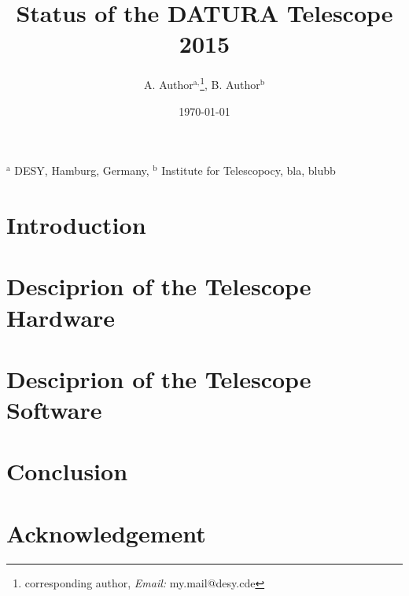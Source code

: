\documentclass{JINST}
\title{Status of the DATURA Telescope 2015}
\author{A. Author${}^{\textrm{a},}$\thanks{corresponding author, \textit{Email:} my.mail@desy.cde}, B. Author${}^{\textrm{b}}$}
\begin{document}
 \setpagewiselinenumbers
\modulolinenumbers[5]
\linenumbers


\date{\today}
\maketitle


\hspace{0.85cm}${}^{\textrm{a}}$ DESY, Hamburg, Germany, ${}^{\textrm{b}}$ Institute for Telescopocy, bla, blubb


\normalsize

\section{Introduction}


\section{Desciprion of the Telescope Hardware}
%

\section{Desciprion of the Telescope Software}
%

\section{Conclusion}

\section*{Acknowledgement}

\small


\end{document}

